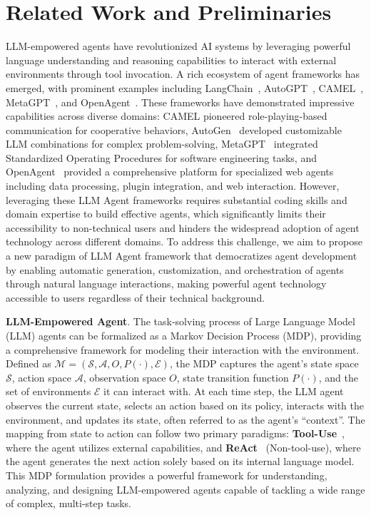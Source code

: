 \section{Related Work and Preliminaries}
\label{sec:preliminary}

LLM-empowered agents have revolutionized AI systems by leveraging powerful language understanding and reasoning capabilities to interact with external environments through tool invocation. A rich ecosystem of agent frameworks has emerged, with prominent examples including LangChain~\cite{langchain2023}, AutoGPT~\cite{AutoGPT}, CAMEL~\cite{camel}, MetaGPT~\cite{hong2024metagpt}, and OpenAgent~\cite{OpenAgents}. These frameworks have demonstrated impressive capabilities across diverse domains: CAMEL pioneered role-playing-based communication for cooperative behaviors, AutoGen~\cite{autogen} developed customizable LLM combinations for complex problem-solving, MetaGPT~\cite{hong2024metagpt} integrated Standardized Operating Procedures for software engineering tasks, and OpenAgent~\cite{OpenAgents} provided a comprehensive platform for specialized web agents including data processing, plugin integration, and web interaction. However, leveraging these LLM Agent frameworks requires substantial coding skills and domain expertise to build effective agents, which significantly limits their accessibility to non-technical users and hinders the widespread adoption of agent technology across different domains. To address this challenge, we aim to propose a new paradigm of LLM Agent framework that democratizes agent development by enabling automatic generation, customization, and orchestration of agents through natural language interactions, making powerful agent technology accessible to users regardless of their technical background.

\noindent \textbf{LLM-Empowered Agent}. The task-solving process of Large Language Model (LLM) agents can be formalized as a Markov Decision Process (MDP), providing a comprehensive framework for modeling their interaction with the environment. Defined as $\mathcal{M} = (\mathcal{S}, \mathcal{A}, O, P(\cdot), \mathcal{E})$, the MDP captures the agent's state space $\mathcal{S}$, action space $\mathcal{A}$, observation space $O$, state transition function $P(\cdot)$, and the set of environments $\mathcal{E}$ it can interact with. At each time step, the LLM agent observes the current state, selects an action based on its policy, interacts with the environment, and updates its state, often referred to as the agent's ``context''. The mapping from state to action can follow two primary paradigms: \textbf{Tool-Use}~\cite{tau_bench}, where the agent utilizes external capabilities, and \textbf{ReAct}~\cite{react} (Non-tool-use), where the agent generates the next action solely based on its internal language model. This MDP formulation provides a powerful framework for understanding, analyzing, and designing LLM-empowered agents capable of tackling a wide range of complex, multi-step tasks.

